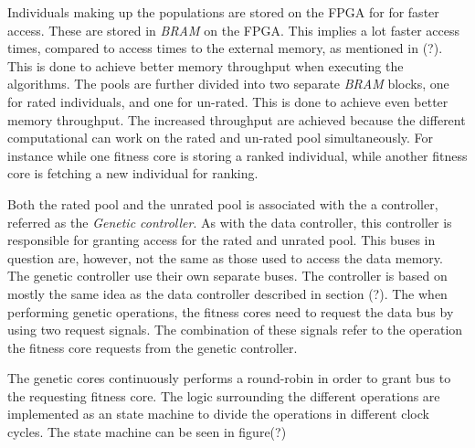 Individuals making up the populations are stored on the FPGA for for faster access. These are stored in \emph{BRAM} on the FPGA. This implies a lot faster access times, compared to access times to the external memory, as mentioned in (?). This is done to achieve better memory throughput when executing the algorithms. The pools are further divided into two separate \emph{BRAM} blocks, one for rated individuals, and one for un-rated. This is done to achieve even better memory throughput. The increased throughput are achieved because the different computational can work on the rated and un-rated pool simultaneously. For instance while one fitness core is storing a ranked individual, while another fitness core is fetching a new individual for ranking. 


Both the rated pool and the unrated pool is associated with the a controller, referred as the \emph{Genetic controller}. As with the data controller, this controller is responsible for granting access for the rated and unrated pool. This buses in question are, however, not the same as those used to access the data memory. The genetic controller use their own separate buses. The controller is based on mostly the same idea as the data controller described in section (?). The when performing genetic operations, the fitness cores need to request the data bus by using two request signals. The combination of these signals refer to the operation the fitness core requests from the genetic controller. 

The genetic cores continuously performs a round-robin in order to grant bus to the requesting fitness core. The logic surrounding the different operations are implemented as an state machine to divide the operations in different clock cycles. The state machine can be seen in figure(?)


